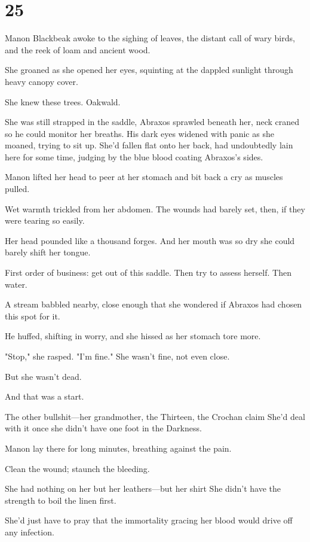 
\chapter{25}

Manon Blackbeak awoke to the sighing of leaves, the distant call of wary birds, and the reek of loam and ancient wood.

She groaned as she opened her eyes, squinting at the dappled sunlight through heavy canopy cover.

She knew these trees. Oakwald.

She was still strapped in the saddle, Abraxos sprawled beneath her, neck craned so he could monitor her breaths. His dark eyes widened with panic as she moaned, trying to sit up. She'd fallen flat onto her back, had undoubtedly lain here for some time, judging by the blue blood coating Abraxos's sides.

Manon lifted her head to peer at her stomach and bit back a cry as muscles pulled.

Wet warmth trickled from her abdomen. The wounds had barely set, then, if they were tearing so easily.

Her head pounded like a thousand forges. And her mouth was so dry she could barely shift her tongue.

First order of business: get out of this saddle. Then try to assess herself. Then water.

A stream babbled nearby, close enough that she wondered if Abraxos had chosen this spot for it.

He huffed, shifting in worry, and she hissed as her stomach tore more.

"Stop," she rasped. "I'm  fine." She wasn't fine, not even close.

But she wasn't dead.

And that was a start.

The other bullshit---her grandmother, the Thirteen, the Crochan claim
 She'd deal with it once she didn't have one foot in the Darkness.

Manon lay there for long minutes, breathing against the pain.

Clean the wound; staunch the bleeding.

She had nothing on her but her leathers---but her shirt  She didn't have the strength to boil the linen first.

She'd just have to pray that the immortality gracing her blood would drive off any infection.

